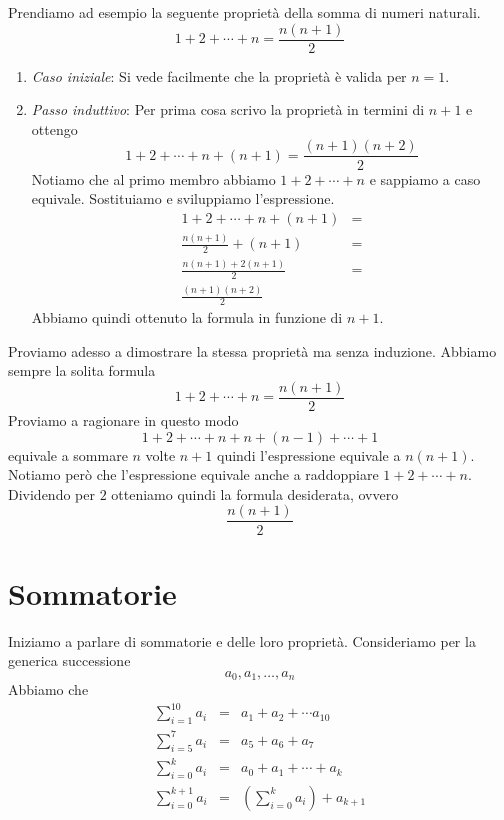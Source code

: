 \begin{example}
	Prendiamo ad esempio la seguente propriet\`a della somma di numeri naturali.
	\[ 1 + 2 + \cdots + n = \frac{n (n + 1)}{2}	\]

	\begin{enumerate}
		\item \emph{Caso iniziale}: Si vede facilmente che la propriet\`a \`e valida per $n = 1$.
		\item \emph{Passo induttivo}: Per prima cosa scrivo la propriet\`a in termini di $n + 1$ e ottengo
		      \[ 1 + 2 + \cdots + n + (n + 1) = \frac{(n + 1)(n + 2)}{2} \]
		      Notiamo che al primo membro abbiamo $1 + 2 + \cdots + n$ e sappiamo a caso equivale. Sostituiamo e
		      sviluppiamo l'espressione.
		      \begin{align*}
			      1 + 2 + \cdots + n + (n + 1)  & = \\
			      \frac{n (n + 1)}{2} + (n + 1) & = \\
			      \frac{n(n + 1) + 2(n + 1)}{2} & = \\
			      \frac{(n + 1)(n + 2)}{2}
		      \end{align*}
		      Abbiamo quindi ottenuto la formula in funzione di $n + 1$.
	\end{enumerate}
\end{example}


\begin{example}
	Proviamo adesso a dimostrare la stessa propriet\`a ma senza induzione. Abbiamo sempre la solita formula
	\[ 1 + 2 + \cdots + n = \frac{n(n + 1)}{2} \]
	Proviamo a ragionare in questo modo
	\[ 1 + 2 + \cdots + n + n + (n - 1) + \cdots + 1 \]
	equivale a sommare $n$ volte $n + 1$ quindi l'espressione equivale a $n(n + 1)$. Notiamo per\`o che l'espressione
	equivale anche a raddoppiare $1 + 2 + \cdots + n$. Dividendo per $2$ otteniamo quindi la formula desiderata, ovvero
	\[ \frac{n(n + 1)}{2} \]
\end{example}

\section{Sommatorie}
Iniziamo a parlare di sommatorie e delle loro propriet\`a. Consideriamo per la generica successione
\[ a_0, a_1, \dots, a_n \]
Abbiamo che
\[
	\begin{array}{rcl}
		\displaystyle\sum_{i = 1}^{10} a_i    & = & a_1 + a_2 + \cdots a_{10}                     \\
		\displaystyle\sum_{i = 5}^7 a_i       & = & a_5 + a_6 + a_7                               \\
		\displaystyle\sum_{i = 0}^k a_i       & = & a_0 + a_1 + \cdots + a_k                      \\
		\displaystyle\sum_{i = 0}^{k + 1} a_i & = & \left( \sum_{i = 0}^k a_i \right) + a_{k + 1}
	\end{array}
\]


